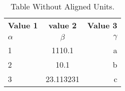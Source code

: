 \documentclass{article}
\begin{document}
	 \begin{table}[h!]
	 	\begin{center}
	 		\caption{Table Without Aligned Units.}
	 		\label{tab:table1}
	 		\begin{tabular}{l|c|r}
	 			\textbf{Value 1} & \textbf{value 2} & \textbf{Value 3}\\
	 			$\alpha$ & $\beta$ & $\gamma$\\
	 			\hline
	 			1 & 1110.1 & a\\
	 			2 & 10.1 & b\\
	 			3 & 23.113231 & c\\
	 		\end{tabular}
	 	\end{center}
	 \end{table}
\end{document}
